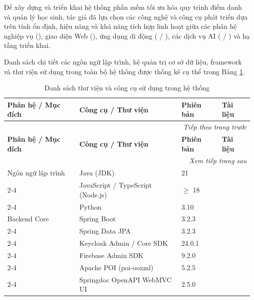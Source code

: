 \documentclass[../DoAn.tex]{subfiles}
\begin{document}
Để xây dựng và triển khai hệ thống phần mềm tối ưu hóa quy trình điểm danh và quản lý học sinh, tác giả đã lựa chọn các công nghệ và công cụ phát triển dựa trên tính ổn định, hiệu năng và khả năng tích hợp linh hoạt giữa các phân hệ nghiệp vụ (), giao diện Web (), ứng dụng di động ( / ), các dịch vụ AI ( / ) và hạ tầng triển khai.

Danh sách chi tiết các ngôn ngữ lập trình, hệ quản trị cơ sở dữ liệu, framework và thư viện sử dụng trong toàn bộ hệ thống được thống kê cụ thể trong Bảng \ref{table:libraries_and_tools}.

\begin{longtable}{|p{}|p{}|p{}|p{}|}
    \caption{Danh sách thư viện và công cụ sử dụng trong hệ thống}
    \label{table:libraries_and_tools}\\
    \hline
    \textbf{Phân hệ / Mục đích} & \textbf{Công cụ / Thư viện} & \textbf{Phiên bản} & \textbf{Tài liệu} \\ \hline
    \endfirsthead
    \multicolumn{4}{r}{\textit{Tiếp theo trang trước}} \\
    \hline
    \textbf{Phân hệ / Mục đích} & \textbf{Công cụ / Thư viện} & \textbf{Phiên bản} & \textbf{Tài liệu} \\ \hline
    \endhead
    \hline
    \multicolumn{4}{r}{\textit{Xem tiếp trang sau}} \\
    \endfoot
    \hline
    \endlastfoot
    
    Ngôn ngữ lập trình & Java (JDK) & 21 & \cite{openjdk_docs} \\ \cline{2-4}
    & JavaScript / TypeScript (Node.js) & $\ge$ 18 & \cite{nodejs_docs} \\ \cline{2-4}
    & Python & 3.10 & \cite{python_docs} \\ \hline
    
    Backend Core & Spring Boot & 3.2.3 & \cite{spring_boot_docs2026} \\ \cline{2-4}
    & Spring Data JPA & 3.2.3 & \cite{spring_data_jpa_docs2026} \\ \cline{2-4}
    & Keycloak Admin / Core SDK & 24.0.1 & \cite{keycloak2026} \\ \cline{2-4}
    & Firebase Admin SDK & 9.2.0 & \cite{fcm2026} \\ \cline{2-4}
    & Apache POI (poi-ooxml) & 5.2.5 & \cite{apache_poi_docs} \\ \cline{2-4}
    & Springdoc OpenAPI WebMVC UI & 2.5.0 & \cite{springdoc_openapi_docs} \\ \hline
    

\end{longtable}
\end{document}
